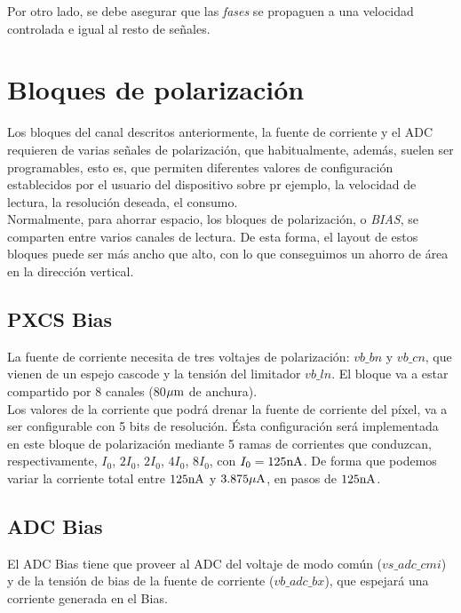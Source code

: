 Por otro lado, se debe asegurar que las \textit{fases} se propaguen a una velocidad
controlada e igual al resto de señales.\\

\section{Bloques de polarización}\label{cap:ro_sch_bias}

Los bloques del canal descritos anteriormente, la fuente de corriente y el ADC
requieren de varias señales de polarización, que habitualmente, además, suelen
ser programables, esto es, que permiten diferentes valores de configuración
establecidos por el usuario del dispositivo sobre pr ejemplo, la velocidad de
lectura, la resolución deseada, el consumo.\\

Normalmente, para ahorrar espacio, los bloques de polarización, o \textit{BIAS},
se comparten entre varios canales de lectura. De esta forma, el layout de estos
bloques puede ser más ancho que alto, con lo que conseguimos un ahorro de área en
la dirección vertical.\\

\subsection{PXCS Bias}

La fuente de corriente necesita de tres voltajes de polarización: $vb\_bn$ y
$vb\_cn$, que vienen de un espejo cascode y la tensión del limitador $vb\_ln$.
El bloque va a estar compartido por 8 canales (80$\mu\text{m}$ de anchura).\\

Los valores de la corriente que podrá drenar la fuente de corriente del píxel, va
a ser configurable con 5 bits de resolución. Ésta configuración será implementada
en este bloque de polarización mediante 5 ramas de corrientes que conduzcan,
respectivamente, $I_0$, $2I_0$, $2I_0$, $4I_0$, $8I_0$, con
$I_0=125\text{nA}$. De forma que podemos variar la corriente total entre $125\text{nA}$ y
$3.875\mu\text{A}$, en pasos de $125\text{nA}$.\\

\subsection{ADC Bias}

El ADC Bias tiene que proveer al ADC del voltaje de modo común ($vs\_adc\_cmi$) y
de la tensión de bias de la fuente de corriente ($vb\_adc\_bx$), que espejará
una corriente generada en el Bias.\\

